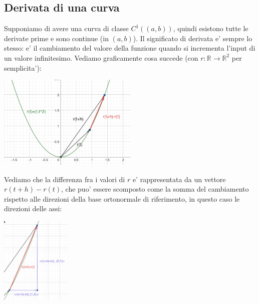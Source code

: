 \documentclass{report}
\begin{document}
\subsection{Derivata di una curva}
Supponiamo di avere una curva di classe $ C^1((a,b)) $, quindi esistono tutte le derivate prime e sono continue (in $ (a,b) $). Il significato di derivata e' sempre lo stesso: e' il cambiamento del valore della funzione quando si incrementa l'input di un valore infinitesimo. Vediamo graficamente cosa succede (con $ r:\mathbb{R}\to\mathbb{R}^2 $ per semplicita'):
\begin{center}
    \includegraphics[width=0.5\textwidth]{ img/2024-05-05-15-17-31.png}
\end{center}
Vediamo che la differenza fra i valori di $ r $ e' rappresentata da un vettore $ r(t+h)-r(t) $, che puo' essere scomposto come la somma del cambiamento rispetto alle direzioni della base ortonormale di riferimento, in questo caso le direzioni delle assi:\\
\begin{center}
\includegraphics[width=0.25\textwidth]{img/2024-05-05-15-54-02.png}
\end{center}
\end{document}
